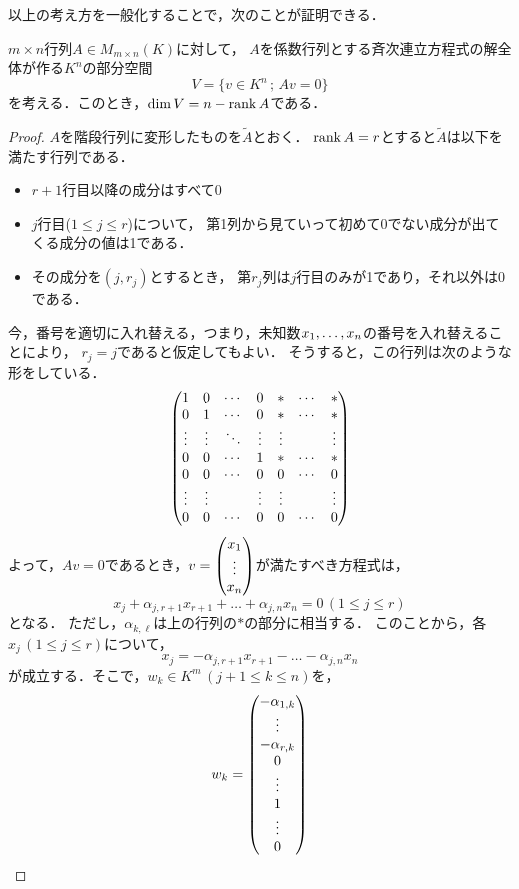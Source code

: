   以上の考え方を一般化することで，次のことが証明できる．
  \begin{thm}\label{thm:solution_space}
    $m \times n$行列$A \in M_{m\times n}(K)$に対して，
    $A$を係数行列とする斉次連立方程式の解全体が作る$K^n$の部分空間
    \[
      V = \{ v \in K^n \,;\, Av = 0\}  
    \]
    を考える．このとき，$\dim V = n - \mathrm{rank}\, A$である．
  \end{thm}
  \begin{proof}
    $A$を階段行列に変形したものを$\widetilde{A}$とおく．
    $\mathrm{rank}\, A = r$とすると$\widetilde{A}$は以下を満たす行列である．
    \begin{itemize}
        \item $r+1$行目以降の成分はすべて0
        \item $j$行目($1 \le j \le r $)について，
        第1列から見ていって初めて0でない成分が出てくる成分の値は1である．
        \item その成分を$(j,r_j)$とするとき，
          第$r_j$列は$j$行目のみが1であり，それ以外は0である．
    \end{itemize}
    今，番号を適切に入れ替える，つまり，未知数$x_{1},\dots,x_{n}$の番号を入れ替えることにより，
    $r_j = j$であると仮定してもよい．
    そうすると，この行列は次のような形をしている．
    \[
      \begin{pmatrix} 
        1 & 0 & \cdots & 0 & \ast & \cdots & \ast \\ 
        0 & 1 & \cdots & 0 & \ast & \cdots & \ast \\
        \vdots & \vdots & \ddots & \vdots & \vdots & & \vdots \\
        0 & 0 & \cdots & 1 & \ast & \cdots & \ast \\
        0 & 0 & \cdots & 0 & 0 & \cdots & 0 \\
        \vdots & \vdots & & \vdots & \vdots &  & \vdots \\
        0 & 0 & \cdots & 0 & 0 & \cdots & 0 \\
       \end{pmatrix}
    \]
    よって，$Av=0$であるとき，$v = \begin{pmatrix} x_1 \\ \vdots \\ x_n \end{pmatrix}$が満たすべき方程式は，
    \[
      x_j + \alpha_{j,r+1} x_{r+1} + \dots + \alpha_{j,n}x_n = 0\, (1 \le j \le r)
    \]
    となる．
  ただし，$\alpha_{k,\ell}$は上の行列の$\ast$の部分に相当する．
  このことから，各$x_j\,(1 \le j \le r)$について，
  \[
    x_j = -\alpha_{j,r+1} x_{r+1} - \dots - \alpha_{j,n}x_n
  \]
  が成立する．そこで，$w_k \in K^m\,(j+1 \le k \le n)$を，
  \[
    w_k = \begin{pmatrix} -\alpha_{1,k} \\ \vdots \\ -\alpha_{r,k} \\ 0 \\ \vdots \\ 1 \\ \vdots \\ 0 \end{pmatrix}
\]
\end{proof}

